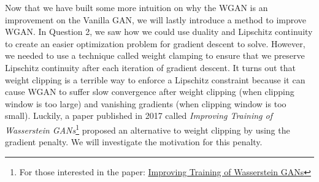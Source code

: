 \newline
Now that we have built some more intuition on why the WGAN is an improvement on the Vanilla GAN, we will lastly introduce a method to improve WGAN. In Question 2, we saw how we could use duality and Lipschitz continuity to create an easier optimization problem for gradient descent to solve. However, we needed to use a technique called weight clamping to ensure that we preserve Lipschitz continuity after each iteration of gradient descent. It turns out that weight clipping is a terrible way to enforce a Lipschitz constraint because it can cause WGAN to suffer slow convergence after weight clipping (when clipping window is too large) and vanishing gradients (when clipping window is too small). Luckily, a paper published in 2017 called \textit{Improving Training of Wasserstein GANs}\footnote{For those interested in the paper: \href{https://arxiv.org/abs/1704.00028/}{Improving Training of Wasserstein GANs}}  proposed an alternative to weight clipping by using the gradient penalty. We will investigate the motivation for this penalty.

